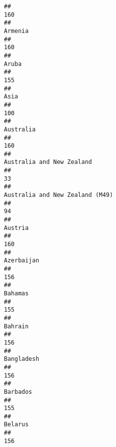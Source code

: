 \documentclass[]{article}
\begin{document}
\begin{verbatim}
##                                                                                          160 
##                                                                                      Armenia 
##                                                                                          160 
##                                                                                        Aruba 
##                                                                                          155 
##                                                                                         Asia 
##                                                                                          100 
##                                                                                    Australia 
##                                                                                          160 
##                                                                    Australia and New Zealand 
##                                                                                           33 
##                                                              Australia and New Zealand (M49) 
##                                                                                           94 
##                                                                                      Austria 
##                                                                                          160 
##                                                                                   Azerbaijan 
##                                                                                          156 
##                                                                                      Bahamas 
##                                                                                          155 
##                                                                                      Bahrain 
##                                                                                          156 
##                                                                                   Bangladesh 
##                                                                                          156 
##                                                                                     Barbados 
##                                                                                          155 
##                                                                                      Belarus 
##                                                                                          156 

\end{verbatim}
\end{document}
